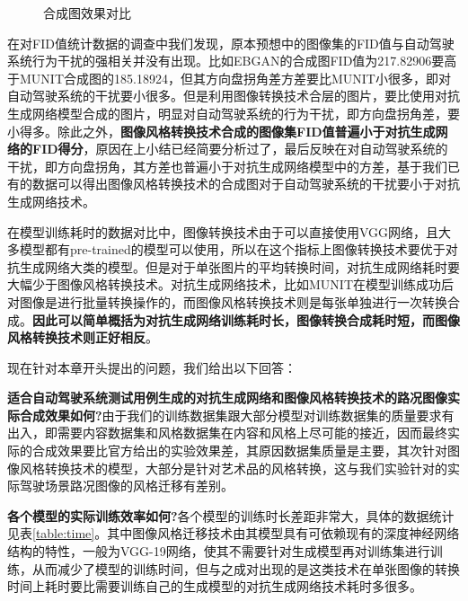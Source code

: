 \begin{figure}[h]
    \centering
    \caption{合成图效果对比}
    \label{fig:new}
\end{figure}

在对FID值统计数据的调查中我们发现，原本预想中的图像集的FID值与自动驾驶系统行为干扰的强相关并没有出现。比如EBGAN的合成图FID值为217.82906要高于MUNIT合成图的185.18924，但其方向盘拐角差方差要比MUNIT小很多，即对自动驾驶系统的干扰要小很多。但是利用图像转换技术合层的图片，要比使用对抗生成网络模型合成的图片，明显对自动驾驶系统的行为干扰，即方向盘拐角差，要小得多。除此之外，\textbf{图像风格转换技术合成的图像集FID值普遍小于对抗生成网络的FID得分}，原因在上小结已经简要分析过了，最后反映在对自动驾驶系统的干扰，即方向盘拐角，其方差也普遍小于对抗生成网络模型中的方差，基于我们已有的数据可以得出图像风格转换技术的合成图对于自动驾驶系统的干扰要小于对抗生成网络技术。

在模型训练耗时的数据对比中，图像转换技术由于可以直接使用VGG网络，且大多模型都有pre-trained的模型可以使用，所以在这个指标上图像转换技术要优于对抗生成网络大类的模型。但是对于单张图片的平均转换时间，对抗生成网络耗时要大幅少于图像风格转换技术。对抗生成网络技术，比如MUNIT在模型训练成功后对图像是进行批量转换操作的，而图像风格转换技术则是每张单独进行一次转换合成。\textbf{因此可以简单概括为对抗生成网络训练耗时长，图像转换合成耗时短，而图像风格转换技术则正好相反}。

现在针对本章开头提出的问题，我们给出以下回答：

\textbf{适合自动驾驶系统测试用例生成的对抗生成网络和图像风格转换技术的路况图像实际合成效果如何?}\quad 由于我们的训练数据集跟大部分模型对训练数据集的质量要求有出入，即需要内容数据集和风格数据集在内容和风格上尽可能的接近，因而最终实际的合成效果要比官方给出的实验效果差，其原因数据集质量是主要，其次针对图像风格转换技术的模型，大部分是针对艺术品的风格转换，这与我们实验针对的实际驾驶场景路况图像的风格迁移有差别。

\textbf{各个模型的实际训练效率如何?}\quad 各个模型的训练时长差距非常大，具体的数据统计见表\ref{table:time}。其中图像风格迁移技术由其模型具有可依赖现有的深度神经网络结构的特性，一般为VGG-19网络，使其不需要针对生成模型再对训练集进行训练，从而减少了模型的训练时间，但与之成对出现的是这类技术在单张图像的转换时间上耗时要比需要训练自己的生成模型的对抗生成网络技术耗时多很多。
